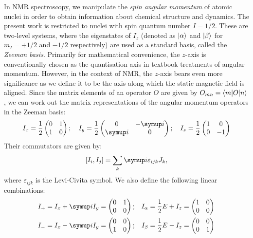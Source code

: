 In NMR spectroscopy, we manipulate the \textit{spin angular momentum} of atomic nuclei in order to obtain information about chemical structure and dynamics.
The present work is restricted to nuclei with spin quantum number $I = 1/2$.
These are two-level systems, where the eigenstates of $I_z$ (denoted as $\ket{\alpha}$ and $\ket{\beta}$ for $m_I = +1/2$ and $-1/2$ respectively) are used as a standard basis, called the \textit{Zeeman basis}.
Primarily for mathematical convenience, the $z$-axis is conventionally chosen as the quantisation axis in textbook treatments of angular momentum.
However, in the context of NMR, the $z$-axis bears even more significance as we define it to be the axis along which the static magnetic field is aligned.
Since the matrix elements of an operator $O$ are given by $O_{mn} = \braket{m|O|n}$, we can work out the matrix representations of the angular momentum operators in the Zeeman basis:
\begin{equation}
    \label{eq:pauli}
    I_x = \frac{1}{2}\begin{pmatrix} 0 & 1 \\ 1 & 0 \end{pmatrix}; \quad 
    I_y = \frac{1}{2}\begin{pmatrix} 0 & -\mi \\ \mi & 0 \end{pmatrix}; \quad 
    I_z = \frac{1}{2}\begin{pmatrix} 1 & 0 \\ 0 & -1 \end{pmatrix}
\end{equation}
Their commutators are given by:
\begin{equation}
    \label{eq:angmom_commutators}
    [I_i, I_j] = \sum_{k} \mi \varepsilon_{ijk}J_k,
\end{equation}
where $\varepsilon_{ijk}$ is the Levi-Civita symbol.
We also define the following linear combinations:
\begin{equation}
    \label{eq:other_single_spin_ops}
    \begin{aligned}
        I_+ = I_x + \mi I_y &= \begin{pmatrix} 0 & 1 \\ 0 & 0 \end{pmatrix}; &
        I_\alpha = \frac{1}{2}E + I_z &= \begin{pmatrix} 1 & 0 \\ 0 & 0 \end{pmatrix} \\
        I_- = I_x - \mi I_y &= \begin{pmatrix} 0 & 0 \\ 1 & 0 \end{pmatrix}; &
        I_\beta = \frac{1}{2}E - I_z &= \begin{pmatrix} 0 & 0 \\ 0 & 1 \end{pmatrix}
    \end{aligned}
\end{equation}
